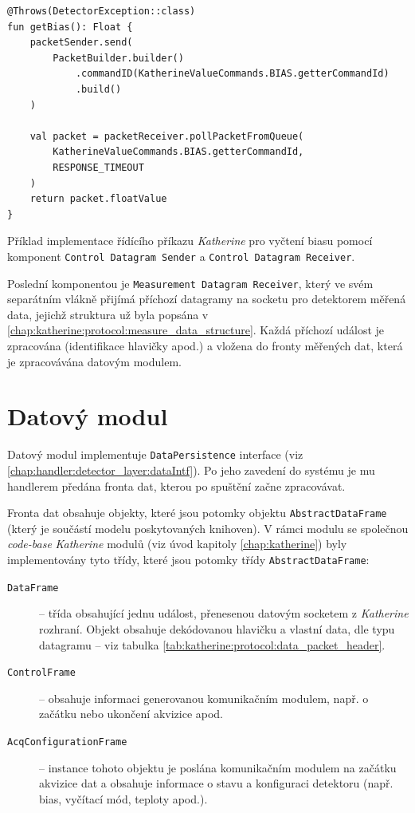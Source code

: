 \begin{code}[h]
    \begin{verbatim}
@Throws(DetectorException::class)
fun getBias(): Float {
    packetSender.send(
        PacketBuilder.builder()
            .commandID(KatherineValueCommands.BIAS.getterCommandId)
            .build()
    )

    val packet = packetReceiver.pollPacketFromQueue(
        KatherineValueCommands.BIAS.getterCommandId,
        RESPONSE_TIMEOUT
    )
    return packet.floatValue
}
    \end{verbatim}
    \caption{Příklad implementace řídícího příkazu \textit{Katherine} pro vyčtení biasu pomocí komponent \texttt{Control Datagram Sender} a \texttt{Control Datagram Receiver}.}
    \label{src:katherine:comm:example_get_bias}
\end{code}

Poslední komponentou je \texttt{Measurement Datagram Receiver}, který ve svém separátním vlákně přijímá příchozí datagramy na socketu pro detektorem měřená data, jejichž struktura už byla popsána v \ref{chap:katherine:protocol:measure_data_structure}. Každá příchozí událost je zpracována (identifikace hlavičky apod.) a vložena do fronty měřených dat, která je zpracovávána datovým modulem.

\section{Datový modul}\label{chap:katherine:data}
Datový modul implementuje \texttt{DataPersistence} interface (viz \ref{chap:handler:detector_layer:dataIntf}). Po jeho zavedení do systému je mu handlerem předána fronta dat, kterou po spuštění začne zpracovávat.

Fronta dat obsahuje objekty, které jsou potomky objektu \texttt{AbstractDataFrame} (který je součástí modelu poskytovaných knihoven). V rámci modulu se společnou \textit{code-base} \textit{Katherine} modulů (viz úvod kapitoly \ref{chap:katherine}) byly implementovány tyto třídy, které jsou potomky třídy \texttt{AbstractDataFrame}:
\begin{description}
    \item[\texttt{DataFrame}] -- třída obsahující jednu událost, přenesenou datovým socketem z \textit{Katherine} rozhraní. Objekt obsahuje dekódovanou hlavičku a vlastní data, dle typu datagramu -- viz tabulka \ref{tab:katherine:protocol:data_packet_header}.
    \item[\texttt{ControlFrame}] -- obsahuje informaci generovanou komunikačním modulem, např. o začátku nebo ukončení akvizice apod.
    \item[\texttt{AcqConfigurationFrame}] -- instance tohoto objektu je poslána komunikačním modulem na začátku akvizice dat a obsahuje informace o stavu a konfiguraci detektoru (např. bias, vyčítací mód, teploty apod.).
\end{description}  

